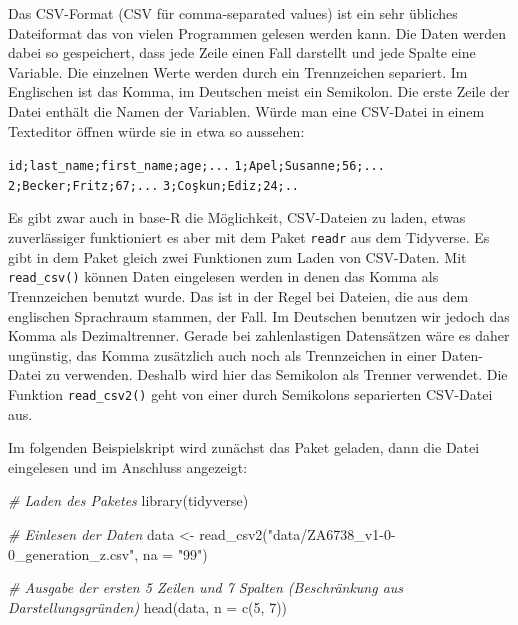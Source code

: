\documentclass[
]{book}
\newenvironment{Shaded}{\begin{snugshade}}{\end{snugshade}}
\newcommand{\AttributeTok}[1]{\textcolor[rgb]{0.77,0.63,0.00}{#1}}
\newcommand{\CommentTok}[1]{\textcolor[rgb]{0.56,0.35,0.01}{\textit{#1}}}
\newcommand{\DecValTok}[1]{\textcolor[rgb]{0.00,0.00,0.81}{#1}}
\newcommand{\FunctionTok}[1]{\textcolor[rgb]{0.00,0.00,0.00}{#1}}
\newcommand{\NormalTok}[1]{#1}
\newcommand{\OtherTok}[1]{\textcolor[rgb]{0.56,0.35,0.01}{#1}}
\newcommand{\StringTok}[1]{\textcolor[rgb]{0.31,0.60,0.02}{#1}}
\begin{document}
Das CSV-Format (CSV für comma-separated values) ist ein sehr übliches Dateiformat das von vielen Programmen gelesen werden kann. Die Daten werden dabei so gespeichert, dass jede Zeile einen Fall darstellt und jede Spalte eine Variable. Die einzelnen Werte werden durch ein Trennzeichen separiert. Im Englischen ist das Komma, im Deutschen meist ein Semikolon. Die erste Zeile der Datei enthält die Namen der Variablen. Würde man eine CSV-Datei in einem Texteditor öffnen würde sie in etwa so aussehen:

\texttt{id;last\_name;first\_name;age;...}
\texttt{1;Apel;Susanne;56;...}
\texttt{2;Becker;Fritz;67;...}
\texttt{3;Coşkun;Ediz;24;..}

Es gibt zwar auch in base-R die Möglichkeit, CSV-Dateien zu laden, etwas zuverlässiger funktioniert es aber mit dem Paket \texttt{readr} aus dem Tidyverse. Es gibt in dem Paket gleich zwei Funktionen zum Laden von CSV-Daten. Mit \texttt{read\_csv()} können Daten eingelesen werden in denen das Komma als Trennzeichen benutzt wurde. Das ist in der Regel bei Dateien, die aus dem englischen Sprachraum stammen, der Fall. Im Deutschen benutzen wir jedoch das Komma als Dezimaltrenner. Gerade bei zahlenlastigen Datensätzen wäre es daher ungünstig, das Komma zusätzlich auch noch als Trennzeichen in einer Daten-Datei zu verwenden. Deshalb wird hier das Semikolon als Trenner verwendet. Die Funktion \texttt{read\_csv2()} geht von einer durch Semikolons separierten CSV-Datei aus.

Im folgenden Beispielskript wird zunächst das Paket geladen, dann die Datei eingelesen und im Anschluss angezeigt:

\begin{Shaded}
\begin{Highlighting}[]
\CommentTok{\# Laden des Paketes}
\FunctionTok{library}\NormalTok{(tidyverse)}

\CommentTok{\# Einlesen der Daten}
\NormalTok{data }\OtherTok{\textless{}{-}} \FunctionTok{read\_csv2}\NormalTok{(}\StringTok{"data/ZA6738\_v1{-}0{-}0\_generation\_z.csv"}\NormalTok{, }\AttributeTok{na =} \StringTok{"99"}\NormalTok{)}
\end{Highlighting}
\end{Shaded}

\begin{Shaded}
\begin{Highlighting}[]
\CommentTok{\# Ausgabe der ersten 5 Zeilen und 7 Spalten (Beschränkung aus Darstellungsgründen)}
\FunctionTok{head}\NormalTok{(data, }\AttributeTok{n =} \FunctionTok{c}\NormalTok{(}\DecValTok{5}\NormalTok{, }\DecValTok{7}\NormalTok{))}
\end{Highlighting}
\end{Shaded}
\end{document}

